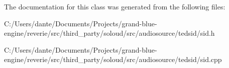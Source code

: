The documentation for this class was generated from the following files\+:\begin{DoxyCompactItemize}
\item 
C\+:/\+Users/dante/\+Documents/\+Projects/grand-\/blue-\/engine/reverie/src/third\+\_\+party/soloud/src/audiosource/tedsid/sid.\+h\item 
C\+:/\+Users/dante/\+Documents/\+Projects/grand-\/blue-\/engine/reverie/src/third\+\_\+party/soloud/src/audiosource/tedsid/sid.\+cpp\end{DoxyCompactItemize}
